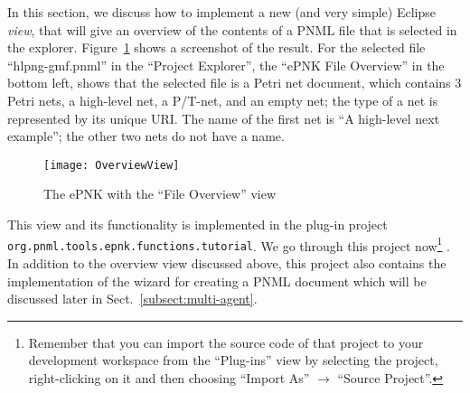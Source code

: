 In this section, we discuss how to implement a new (and very simple)
Eclipse \emph{view}, that will give an overview of the contents of a PNML
file that is selected in the explorer. Figure~\ref{fig:file-overview-view} shows
a screenshot of the result. For the selected file ``hlpng-gmf.pnml''
in the ``Project Explorer'',  the ``ePNK File Overview'' in the
bottom left, shows that the selected file is a Petri net document,
which contains 3 Petri nets, a high-level net, a P/T-net, and
an empty net; the type of a net is represented by its unique
URI. The name of the first net is ``A high-level next
example''; the other two nets do not have a name.

\begin{figure}[hbt!!]
  \centerline{\texttt{[image: OverviewView]}}
  \caption{The ePNK with the ``File Overview'' view}
  \label{fig:file-overview-view}
\end{figure}

This view and its functionality is implemented in the plug-in project
{\tt org.pnml.tools.epnk.functions.tutorial}. We go through this
project now\footnote
 {Remember that you can import the source code of that project to your
  development workspace from the ``Plug-ins'' view by selecting the
  project, right-clicking on it and then choosing ``Import As'' $\rightarrow$
  ``Source Project''.}%
.  In addition to the overview view discussed above, this project also contains
the implementation of the wizard for creating a PNML document which will be
discussed later in Sect.~\ref{subsect:multi-agent}.

